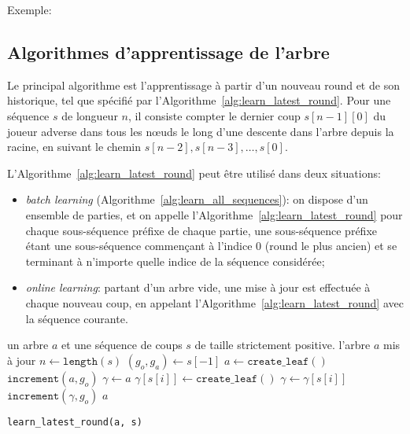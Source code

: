 \documentclass[10pt,a4paper]{article}
\theoremstyle{plain} %
\theoremstyle{definition} %
\theoremstyle{remark} %
\def\noeud{n\oe ud\xspace}
\def\noeuds{n\oe uds\xspace}
\begin{document}
Exemple:

\subsection{Algorithmes d'apprentissage de l'arbre}

Le principal algorithme est l'apprentissage à partir d'un nouveau round et de son historique, tel que spécifié par l'Algorithme~\ref{alg:learn_latest_round}. Pour une séquence $s$ de longueur $n$, il consiste compter le dernier coup $s\left [n-1\right ]\left [0\right ]$ du joueur adverse dans tous les \noeuds le long d'une descente dans l'arbre depuis la racine, en suivant le chemin $s\left [n-2\right ], s\left [n-3\right ], \ldots, s\left [0\right ]$.

L'Algorithme~\ref{alg:learn_latest_round} peut être utilisé dans deux situations:
\begin{itemize}
\item \textit{batch learning} (Algorithme~\ref{alg:learn_all_sequences}): on dispose d'un ensemble de parties, et on appelle l'Algorithme~\ref{alg:learn_latest_round} pour chaque sous-séquence préfixe de chaque partie, une sous-séquence préfixe étant une sous-séquence commençant à l'indice 0 (round le plus ancien) et se terminant à n'importe quelle indice de la séquence considérée;
\item \textit{online learning}: partant d'un arbre vide, une mise à jour est effectuée à chaque nouveau coup, en appelant l'Algorithme~\ref{alg:learn_latest_round} avec la séquence courante.
\end{itemize}

\begin{algorithm}
\begin{algorithmic}[1]
\REQUIRE un arbre $a$ et une séquence de coups $s$ de taille strictement positive.
\ENSURE l'arbre $a$ mis à jour
\STATE $n \leftarrow \texttt{length}(s)$
\STATE $\left (g_o, g_a\right ) \leftarrow s\left [-1\right ]$ 
    \STATE $a \leftarrow \texttt{create\_leaf}()$
\ENDIF
\COMMENT{}
\STATE $\texttt{increment}\left (a, g_o\right )$
\STATE $\gamma \leftarrow a$ \COMMENT{initialisation du \noeud courant}
\STATE $\gamma\left [s\left [i\right ]\right ] \leftarrow \texttt{create\_leaf}()$
\ENDIF
\STATE $\gamma \leftarrow \gamma\left [s\left [i\right ]\right ]$
\STATE $\texttt{increment}\left (\gamma, g_o\right )$
\ENDFOR
\RETURN $a$
\end{algorithmic}
\caption{\texttt{learn\_latest\_round(a, s)}}
\label{alg:learn_latest_round}
\end{algorithm}
\end{document}
